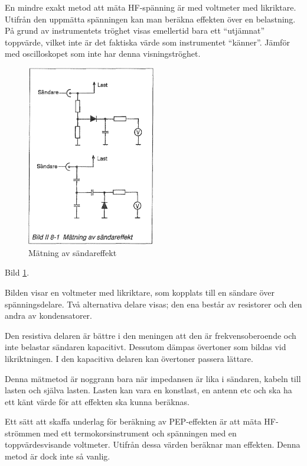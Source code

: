 En mindre exakt metod att mäta HF-spänning är med voltmeter med
likriktare.  Utifrån den uppmätta spänningen kan man beräkna effekten
över en belastning. På grund av instrumentets tröghet visas emellertid
bara ett ``utjämnat'' toppvärde, vilket inte är det faktiska värde som
instrumentet ``känner''. Jämför med oscilloskopet som inte har denna
visningströghet.

\begin{figure}
  \includegraphics[width=0.5\textwidth]{images/bild_2_8-01}
  \caption{Mätning av sändareffekt}
  \label{fig:bildII8-1}
\end{figure}

Bild \ref{fig:bildII8-1}.

Bilden visar en voltmeter med likriktare, som kopplats till en sändare
över spänningsdelare. Två alternativa delare visas; den ena består av
resistorer och den andra av kondensatorer.

Den resistiva delaren är bättre i den meningen att den är
frekvensoberoende och inte belastar sändaren kapacitivt. Dessutom
dämpas övertoner som bildas vid likriktningen. I den kapacitiva
delaren kan övertoner passera lättare.

Denna mätmetod är noggrann bara när impedansen är lika i sändaren,
kabeln till lasten och själva lasten. Lasten kan vara en konstlast, en
antenn etc och ska ha ett känt värde för att effekten ska kunna
beräknas.

Ett sätt att skaffa underlag för beräkning av PEP-effekten är att mäta
HF-strömmen med ett termokorsinstrument och spänningen med en
toppvärdesvisande voltmeter.  Utifrån dessa värden beräknar man
effekten. Denna metod är dock inte så vanlig.

